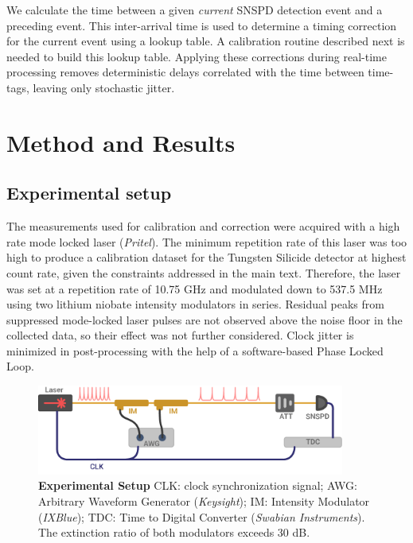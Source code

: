 \documentclass[11pt]{caltech_thesis} %
\begin{document}
We calculate the time between a given \emph{current} SNSPD detection event and a preceding event. This inter-arrival time is used to determine a timing correction for the current event using a lookup table. A calibration routine described next is needed to build this lookup table. Applying these corrections during real-time processing removes deterministic delays correlated with the time between time-tags, leaving only stochastic jitter.

\hypertarget{method-and-results}{%
\section{Method and Results}\label{method-and-results}}

\hypertarget{experimental-setup}{%
\subsection{Experimental setup}\label{experimental-setup}}

The measurements used for calibration and correction were acquired with a high rate mode locked laser (\emph{Pritel}). The minimum repetition rate of this laser was too high to produce a calibration dataset for the Tungsten Silicide detector at highest count rate, given the constraints addressed in the main text. Therefore, the laser was set at a repetition rate of 10.75 GHz and modulated down to 537.5 MHz using two lithium niobate intensity modulators in series. Residual peaks from suppressed mode-locked laser pulses are not observed above the noise floor in the collected data, so their effect was not further considered. Clock jitter is minimized in post-processing with the help of a software-based Phase Locked Loop.

\hypertarget{fig:jitterate_exp_setup}{%
\begin{figure}
\centering
\includegraphics[width=0.9\textwidth,height=\textheight]{chapter_02/figs_02/supplemental_expirement_light.pdf}
\caption[{Time walk experiment setup}]{\textbf{Experimental Setup} CLK: clock synchronization signal; AWG: Arbitrary Waveform Generator (\emph{Keysight}); IM: Intensity Modulator (\emph{IXBlue}); TDC: Time to Digital Converter (\emph{Swabian Instruments}). The extinction ratio of both modulators exceeds 30 dB.}
\label{fig:jitterate_exp_setup}
\end{figure}
}
\end{document}
